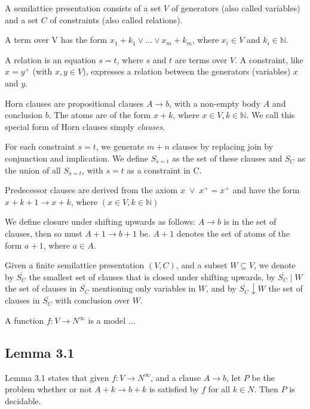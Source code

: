 A semilattice presentation consists of a set $V$ of generators
(also called variables) and a set $C$ of constraints
(also called relations).

A term over V has the form $x_1 + k_1 \lor \ldots \lor x_m + k_m$, where $x_i \in V$ and $k_i \in \mathbb{N}$.

A relation is an equation $s = t$, where $s$ and $t$ are terms over $V$.
A constraint, like $x = y^+$ (with $x, y \in V$), expresses a relation between the generators (variables) $x$ and $y$.

Horn clauses are propositional clauses $A \rightarrow b$, with a non-empty body $A$ and conclusion $b$.
The atoms are of the form $x + k$, where $x \in V, k \in \mathbb{N}$.
We call this special form of Horn clauses simply \textit{clauses}.

For each constraint $s = t$, we generate $m + n$ clauses by replacing join by conjunction and implication.
We define $S_{s=t}$ as the set of these clauses and $S_C$ as the union of all $S_{s=t}$, with $s = t$ as a constraint in C.

Predecessor clauses are derived from the axiom $x \; \lor \; x^{+} = x^{+}$ and have the form
$x + k + 1 \rightarrow x + k$, where $(x \in V, k \in \mathbb{N})$

We define closure under shifting upwards as follows:
$A \rightarrow b$ is in the set of clauses, then so must $A + 1 \rightarrow b + 1$ be.
$A + 1$ denotes the set of atoms of the form $a + 1$, where $a \in A$.

Given a finite semilattice presentation $(V, C)$,
and a subset $W \subseteq V$, we denote by
$\overline{S_C}$ the smallest set of clauses that is closed under shifting upwards,
by $\overline{S_C} \mid W$ the set of clauses in $\overline{S_C}$
mentioning only variables in $W$, and by $\overline{S_C} \downarrow W$
the set of clauses in $\overline{S_C}$ with conclusion over $W$.

A function $f : V \rightarrow N^{\infty}$ is a model $\ldots$


\subsection{Lemma 3.1}
\label{ssec:lemma_3_1}

Lemma 3.1 states that given $f : V \rightarrow N^{\infty}$,
and a clause $A \rightarrow b$, let $P$ be the problem whether or not
$A + k \rightarrow b + k$ is satisfied by $f$ for all $k \in N$.
Then $P$ is decidable. \cite[p.~3]{mbezem}


